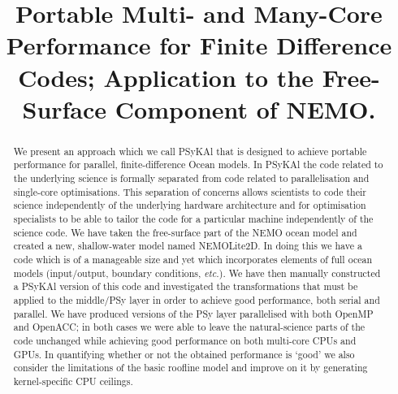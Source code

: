 \documentclass[gmd, manuscript]{copernicus}
\begin{document}
\title{Portable Multi- and Many-Core Performance for Finite Difference Codes;
  Application to the Free-Surface Component of NEMO.}







\received{}
\pubdiscuss{} %
\revised{}
\accepted{}
\published{}

\maketitle

\begin{abstract}

We present an approach which we call {PS}y{KA}l that is designed to achieve
portable performance for parallel, finite-difference Ocean models.  In
{PS}y{KA}l the code related to the underlying science is formally
separated from code related to parallelisation and single-core
optimisations. This separation of concerns allows scientists to code
their science independently of the underlying hardware architecture
and for optimisation specialists to be able to tailor the code for a
particular machine independently of the science code. We have taken
the free-surface part of the NEMO ocean model and created a new,
shallow-water model named NEMOLite2D. In doing this we have a code
which is of a manageable size and yet which incorporates elements of
full ocean models (input/output, boundary conditions, \textit{etc.}).
We have then manually constructed a {PS}y{KA}l version of this code and
investigated the transformations that must be applied to the
middle/PSy layer in order to achieve good performance, both serial and
parallel. We have produced versions of the PSy layer parallelised with
both OpenMP and OpenACC; in both cases we were able to leave the
natural-science parts of the code unchanged while achieving good
performance on both multi-core CPUs and GPUs. In quantifying whether
or not the obtained performance is `good' we also consider the
limitations of the basic roofline model and improve on it
by generating kernel-specific CPU ceilings.

\end{abstract}
\end{document}
